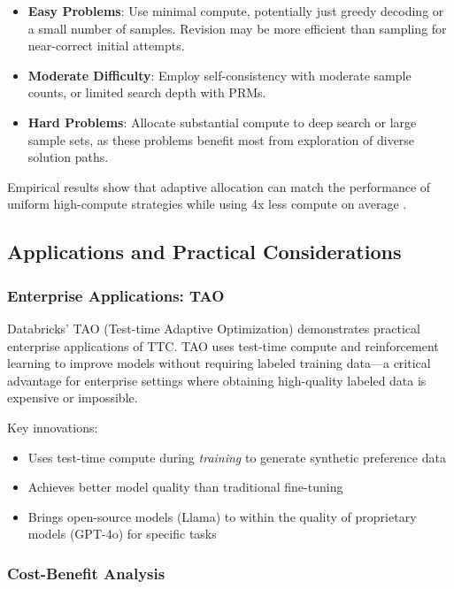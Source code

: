 \begin{itemize}
    \item \textbf{Easy Problems}: Use minimal compute, potentially just greedy decoding or a small number of samples. Revision may be more efficient than sampling for near-correct initial attempts.
    
    \item \textbf{Moderate Difficulty}: Employ self-consistency with moderate sample counts, or limited search depth with PRMs.
    
    \item \textbf{Hard Problems}: Allocate substantial compute to deep search or large sample sets, as these problems benefit most from exploration of diverse solution paths.
\end{itemize}

Empirical results show that adaptive allocation can match the performance of uniform high-compute strategies while using 4x less compute on average \citep{snell2024scaling}.

\subsection{Applications and Practical Considerations}

\subsubsection{Enterprise Applications: TAO}

Databricks' TAO (Test-time Adaptive Optimization) \citep{databricks2024tao} demonstrates practical enterprise applications of TTC. TAO uses test-time compute and reinforcement learning to improve models without requiring labeled training data—a critical advantage for enterprise settings where obtaining high-quality labeled data is expensive or impossible.

Key innovations:
\begin{itemize}
    \item Uses test-time compute during \textit{training} to generate synthetic preference data
    \item Achieves better model quality than traditional fine-tuning
    \item Brings open-source models (Llama) to within the quality of proprietary models (GPT-4o) for specific tasks
\end{itemize}

\subsubsection{Cost-Benefit Analysis}

